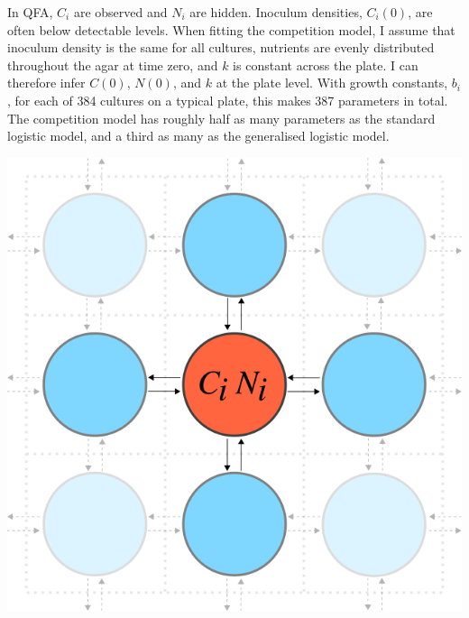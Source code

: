 In QFA, \(C_{i}\) are observed and \(N_{i}\) are hidden. Inoculum
densities, \(C_{i}(0)\), are often below detectable levels. When
fitting the competition model, I assume that inoculum density is the
same for all cultures, nutrients are evenly distributed throughout the
agar at time zero, and \(k\) is constant across the plate. I can
therefore infer \(C(0)\), \(N(0)\), and \(k\) at the plate level. With
growth constants, \(b_{i}\), for each of 384 cultures on a typical
plate, this makes 387 parameters in total. The competition model has
roughly half as many parameters as the standard logistic model, and a
third as many as the generalised logistic model.
\begin{Figure}
  \centering
  \includegraphics[width=\linewidth]{comp_model/comp_model_schematic2}
  \label{fig:comp_model_schematic}
\end{Figure}

